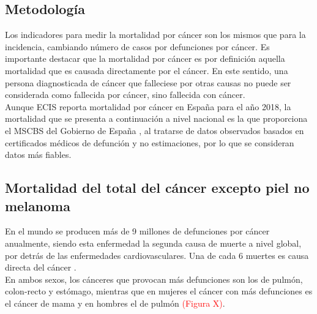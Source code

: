 \subsection{Metodología}

Los indicadores para medir la mortalidad por cáncer son los mismos que para la incidencia, cambiando número de casos por defunciones por cáncer. Es importante destacar que la mortalidad por cáncer es por definición aquella mortalidad que es causada directamente por el cáncer. En este sentido, una persona diagnosticada de cáncer que falleciese por otras causas no puede ser considerada como fallecida por cáncer, sino fallecida con cáncer.\\

Aunque ECIS \cite{ECIS} reporta mortalidad por cáncer en España para el año 2018, la mortalidad que se presenta a continuación a nivel nacional es la que proporciona el MSCBS del Gobierno de España \cite{MSCBS}, al tratarse de datos observados basados en certificados médicos de defunción y no estimaciones, por lo que se consideran datos más fiables.
 
\subsection{Mortalidad del total del cáncer excepto piel no melanoma}

En el mundo se producen más de 9 millones de defunciones por cáncer anualmente, siendo esta enfermedad la segunda causa de muerte a nivel global, por detrás de las enfermedades cardiovasculares. Una de cada 6 muertes es causa directa del cáncer \cite{WorldHealthOrganization2018}.\\

En ambos sexos, los cánceres que provocan más defunciones son los de pulmón, colon-recto y estómago, mientras que en mujeres el cáncer con más defunciones es el cáncer de mama y en hombres el de pulmón \textcolor{red}{(Figura X)}.\\

